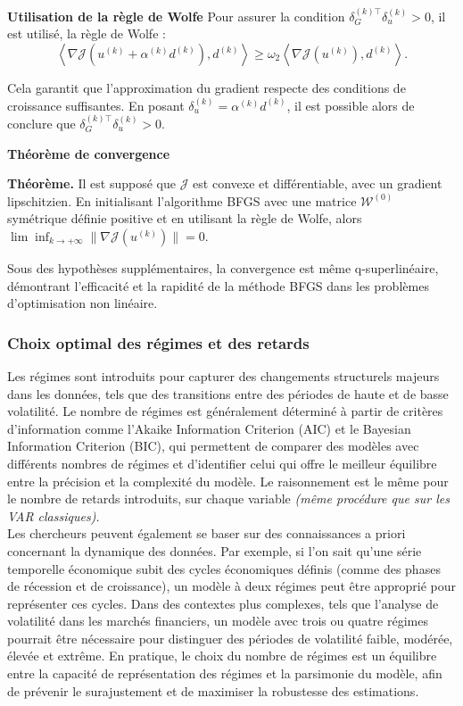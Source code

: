 \begin{sloppypar}
\textbf{Utilisation de la règle de Wolfe}  
Pour assurer la condition $\delta_G^{(k) \top} \delta_u^{(k)} > 0$, il est utilisé, la règle de Wolfe :
\begin{equation}
    \left\langle \nabla \mathcal{J}(u^{(k)} + \alpha^{(k)} d^{(k)}), d^{(k)} \right\rangle \geq \omega_2 \left\langle \nabla \mathcal{J}(u^{(k)}), d^{(k)} \right\rangle.
\end{equation}

Cela garantit que l'approximation du gradient respecte des conditions de croissance suffisantes. En posant $\delta_u^{(k)} = \alpha^{(k)} d^{(k)}$, il est possible alors de conclure que $\delta_G^{(k) \top} \delta_u^{(k)} > 0$.  

\textbf{Théorème de convergence}  
\begin{tcolorbox}{\textbf{Théorème.}}
    Il est supposé que $\mathcal{J}$ est convexe et différentiable, avec un gradient lipschitzien. En initialisant l'algorithme BFGS avec une matrice $\mathcal{W}^{(0)}$ symétrique définie positive et en utilisant la règle de Wolfe, alors $\lim \inf_{k \to +\infty} \|\nabla \mathcal{J}(u^{(k)})\| = 0$.
\end{tcolorbox}

Sous des hypothèses supplémentaires, la convergence est même q-superlinéaire, démontrant l'efficacité et la rapidité de la méthode BFGS dans les problèmes d'optimisation non linéaire.


\subsubsection{Choix optimal des régimes et des retards}

Les régimes sont introduits pour capturer des changements structurels majeurs dans les données, tels que des transitions entre des périodes de haute et de basse volatilité. Le nombre de régimes est généralement déterminé à partir de critères d'information comme l'Akaike Information Criterion (AIC) et le Bayesian Information Criterion (BIC), qui permettent de comparer des modèles avec différents nombres de régimes et d'identifier celui qui offre le meilleur équilibre entre la précision et la complexité du modèle. Le raisonnement est le même pour le nombre de retards introduits, sur chaque variable \textit{(même procédure que sur les VAR classiques).} \\

Les chercheurs peuvent également se baser sur des connaissances a priori concernant la dynamique des données. Par exemple, si l'on sait qu'une série temporelle économique subit des cycles économiques définis (comme des phases de récession et de croissance), un modèle à deux régimes peut être approprié pour représenter ces cycles. Dans des contextes plus complexes, tels que l'analyse de volatilité dans les marchés financiers, un modèle avec trois ou quatre régimes pourrait être nécessaire pour distinguer des périodes de volatilité faible, modérée, élevée et extrême. En pratique, le choix du nombre de régimes est un équilibre entre la capacité de représentation des régimes et la parsimonie du modèle, afin de prévenir le surajustement et de maximiser la robustesse des estimations.\\


\end{sloppypar}
